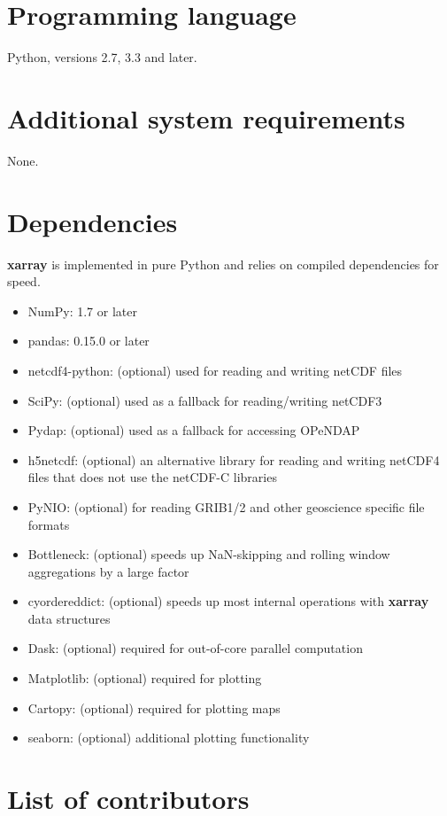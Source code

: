\documentclass{jors}
\begin{document}
\section*{Programming language}

Python, versions 2.7, 3.3 and later.

\section*{Additional system requirements}

None.

\section*{Dependencies}

\textbf{xarray} is implemented in pure Python and relies on compiled dependencies for
speed.

\begin{itemize}
\item NumPy: 1.7 or later
\item pandas: 0.15.0 or later
\item netcdf4-python: (optional) used for reading and writing netCDF files
\item SciPy: (optional) used as a fallback for reading/writing netCDF3
\item Pydap: (optional) used as a fallback for accessing OPeNDAP
\item h5netcdf: (optional) an alternative library for reading and writing netCDF4 files that does not use the netCDF-C libraries
\item PyNIO: (optional) for reading GRIB1/2 and other geoscience specific file formats
\item Bottleneck: (optional) speeds up NaN-skipping and rolling window aggregations by a large factor
\item cyordereddict: (optional) speeds up most internal operations with \textbf{xarray} data structures
\item Dask: (optional) required for out-of-core parallel computation
\item Matplotlib: (optional) required for plotting
\item Cartopy: (optional) required for plotting maps
\item seaborn: (optional) additional plotting functionality
\end{itemize}

\section*{List of contributors}
\end{document}
